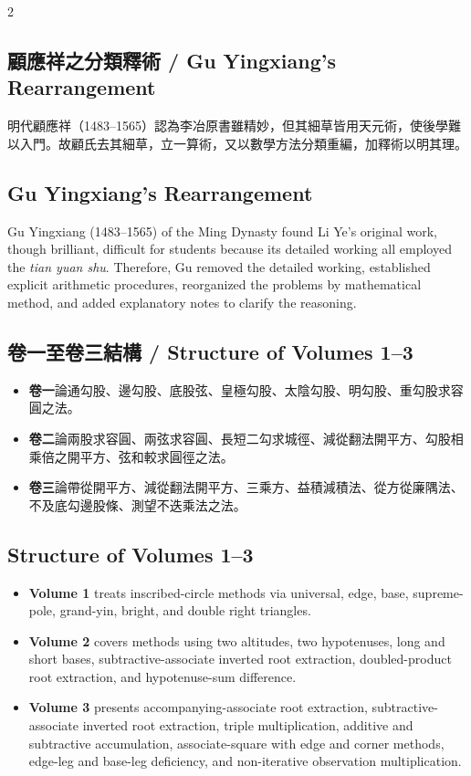 \documentclass[11pt,a4paper]{article}
\newcounter{problem}[section]
\begin{document}
\begin{paracol}{2}
\subsection*{顧應祥之分類釋術 / Gu Yingxiang's Rearrangement}

明代顧應祥（1483--1565）認為李冶原書雖精妙，但其細草皆用天元術，使後學難以入門。故顧氏去其細草，立一算術，又以數學方法分類重編，加釋術以明其理。

\switchcolumn

\subsection*{Gu Yingxiang's Rearrangement}

Gu Yingxiang (1483--1565) of the Ming Dynasty found Li Ye's original work, though brilliant, difficult for students because its detailed working all employed the \textit{tian yuan shu}. Therefore, Gu removed the detailed working, established explicit arithmetic procedures, reorganized the problems by mathematical method, and added explanatory notes to clarify the reasoning.

\switchcolumn

\subsection*{卷一至卷三結構 / Structure of Volumes 1--3}

\begin{itemize}
\item \textbf{卷一}論通勾股、邊勾股、底股弦、皇極勾股、太陰勾股、明勾股、重勾股求容圓之法。
\item \textbf{卷二}論兩股求容圓、兩弦求容圓、長短二勾求城徑、減從翻法開平方、勾股相乘倍之開平方、弦和較求圓徑之法。
\item \textbf{卷三}論帶從開平方、減從翻法開平方、三乘方、益積減積法、從方從廉隅法、不及底勾邊股條、測望不迭乘法之法。
\end{itemize}

\switchcolumn

\subsection*{Structure of Volumes 1--3}

\begin{itemize}
\item \textbf{Volume 1} treats inscribed-circle methods via universal, edge, base, supreme-pole, grand-yin, bright, and double right triangles.
\item \textbf{Volume 2} covers methods using two altitudes, two hypotenuses, long and short bases, subtractive-associate inverted root extraction, doubled-product root extraction, and hypotenuse-sum difference.
\item \textbf{Volume 3} presents accompanying-associate root extraction, subtractive-associate inverted root extraction, triple multiplication, additive and subtractive accumulation, associate-square with edge and corner methods, edge-leg and base-leg deficiency, and non-iterative observation multiplication.
\end{itemize}


\end{paracol}
\end{document}
